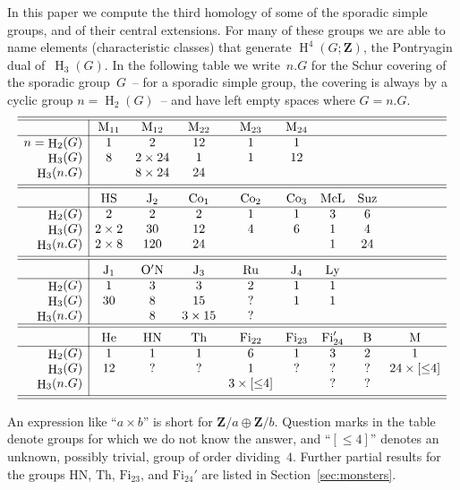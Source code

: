 \documentclass[pdftex]{sigma}
\numberwithin{equation}{section}
\newcommand\bZ{\mathbf Z}
\DeclareMathOperator\homology{H}
\renewcommand\H{\homology}
\newcommand\<\langle
\renewcommand\>\rangle
\newcommand\Fi{\mathrm{Fi}}
\begin{document}
In this paper we compute the third homology of some of the sporadic simple groups, and of their central extensions. For many of these groups we are able to name elements (characteristic classes) that generate $\H^4(G;\bZ)$, the Pontryagin dual of~$\H_3(G)$. In the following table we write~$n.G$ for the Schur covering of the sporadic group~$G$~-- for a sporadic simple group, the covering is always by a cyclic group $n = \H_2(G)$~-- and have left empty spaces where $G = n.G$.
\begin{gather*}
\begin{array}{r|cccccccc}
\hline \hline
& \mathrm{M}_{11} &
\mathrm{M}_{12} &
\mathrm{M}_{22} &
\mathrm{M}_{23} &
\mathrm{M}_{24} &
\\
\hline
n = \H_2(G) & 1 & 2 & 12 & 1 & 1 \\
\H_3(G) & 8 & 2 \times 24 & 1 & 1 & 12 \\
\H_3(n.G) & & 8 \times 24 & 24 & & \\
[3pt]
\hline \hline
\\[-9pt]
& \mathrm{HS} &
\mathrm{J}_2 &
\mathrm{Co}_1 &
\mathrm{Co}_2 &
\mathrm{Co}_3 &
\mathrm{McL} &
\mathrm{Suz} &
\\
\hline
\H_2(G) & 2 & 2 & 2 & 1 & 1 & 3 & 6 \\
\H_3(G) & 2 \times 2 & 30 & 12 & 4 & 6 & 1 & 4 \\
\H_3(n.G) & 2 \times 8 & 120 & 24 & & & 1 & 24\\
[3pt]
\hline \hline
\\[-9pt]
& \mathrm{J}_1 &
\mathrm{O'N} &
\mathrm{J}_3 &
\mathrm{Ru} &
\mathrm{J}_4 &
\mathrm{Ly} \\
\hline
\H_2(G) & 1 & 3 & 3 & 2 & 1 & 1\\
\H_3(G) & 30 & 8 & 15 & ? & 1 & 1 \\
\H_3(n.G) & & 8 & 3\times 15 & ? & & \\
\hline\hline
\\[-9pt]
& \mathrm{He} & \mathrm{HN} &
\mathrm{Th} &
\mathrm{Fi}_{22} &
\mathrm{Fi}_{23} &
\mathrm{Fi}'_{24} &
\mathrm{B} &
\mathrm{M}
\\
\hline
\H_2(G) & 1 & 1 & 1 & 6 & 1 & 3 & 2 & 1\\
\H_3(G) & 12 & ? & ? & 1 & ? & ? & ? & 24 \times [{\leq} 4] \\
\H_3(n.G) & & & & 3 \times [{\leq} 4]& &? & ?\\
[3pt]
\hline \hline
\end{array}
\end{gather*}

An expression like
``$a \times b$''
 is short for
 $\bZ/a \oplus \bZ/b$.
 Question marks in the table denote groups for which we do not know the answer, and ``$[{\leq} 4]$'' denotes an unknown, possibly trivial, group of order dividing~$4$.
Further partial results for the groups $\mathrm{HN}$, $\mathrm{Th}$, $\Fi_{23}$, and $\Fi_{24}'$ are listed in Section~\ref{sec:monsters}.
\end{document}
